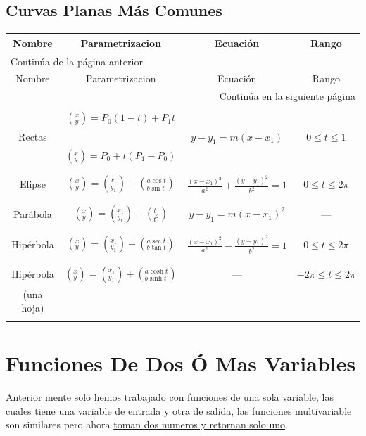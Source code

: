 \documentclass{article}
\begin{document}
\subsection{Curvas Planas Más Comunes}
\label{sec:org7317050}
\begin{longtable}{|c|c|c|c|}
\hline
Nombre & Parametrizacion & Ecuación & Rango\\
\hline
\endfirsthead
\multicolumn{4}{l}{Continúa de la página anterior} \\
\hline

Nombre & Parametrizacion & Ecuación & Rango \\

\hline
\endhead
\hline\multicolumn{4}{r}{Continúa en la siguiente página} \\
\endfoot
\endlastfoot
\hline
 &  &  & \\
 & \((^x_y)=P_0(1-t)+P_1t\) &  & \\
Rectas &  & \(y-y_1=m(x-x_1)\) & \(0\leq t\leq 1\)\\
 & \((^x_y)=P_0+t(P_1-P_0)\) &  & \\
 &  &  & \\
\hline
 &  &  & \\
Elipse & \((^x_y)=(^{x_1}_{y_1})+\left(^{a\cos t}_{b\sin t}\right)\) & \(\frac{(x-x_1)^2}{a^2}+\frac{(y-y_1)^2}{b^2}=1\) & \(0\leq t\leq 2\pi\)\\
 &  &  & \\
\hline
 &  &  & \\
Parábola & \((^x_y)=(^{x_1}_{y_1})+\left(^{t}_{t^2}\right)\) & \(y-y_1=m(x-x_1)^2\) & ---\\
 &  &  & \\
\hline
 &  &  & \\
Hipérbola & \((^x_y)=(^{x_1}_{y_1})+\left(^{a\sec t}_{b\tan t}\right)\) & \(\frac{(x-x_1)^2}{a^2}-\frac{(y-y_1)^2}{b^2}=1\) & \(0\leq t\leq 2\pi\)\\
 &  &  & \\
\hline
 &  &  & \\
Hipérbola & \((^x_y)=(^{x_1}_{y_1})+\left(^{a\cosh t}_{b\sinh t}\right)\) & --- & \(-2\pi\leq t\leq 2\pi\)\\
(una hoja) &  &  & \\
 &  &  & \\
\hline
\end{longtable}


\section{Funciones De Dos Ó Mas Variables}
\label{sec:org362422f}
Anterior mente solo hemos trabajado con funciones de una sola variable, las cuales tiene una variable de entrada y otra de salida, las funciones multivariable son similares pero ahora \uline{toman dos numeros y retornan solo uno}. 
\end{document}
